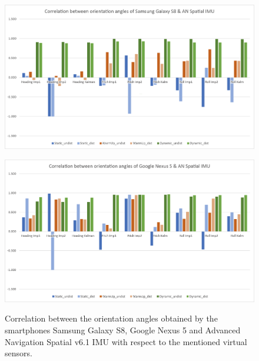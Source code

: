 \documentclass[review]{elsarticle}
\begin{document}
\begin{figure}[htbp!]
\begin{center}
	 	\begin{minipage}{\columnwidth}
	 		\centering
			\subfigure
			{\includegraphics[keepaspectratio, width=1\columnwidth]{graphics/sensor_correlation_s8_imu}\label{fig:sensor_sensi:imu_correlation_s8_nex5:s8}}
	 	\end{minipage} 
	 	\begin{minipage}{\columnwidth}
	 		\centering
			\subfigure 
			{\includegraphics[keepaspectratio, width=1\columnwidth]{graphics/sensor_correlation_nex5_imu}\label{fig:sensor_sensi:imu_correlation_s8_nex5:nex5}}
	 	\end{minipage}
		
		\caption{Correlation between the orientation angles obtained by the smartphones Samsung Galaxy S8, Google Nexus 5 and Advanced Navigation Spatial v6.1 \gls{IMU} with respect to the mentioned virtual sensors. }
	\label{fig:sensor_sensi:imu_correlation_s8_nex5}
\end{center}
\end{figure}
\end{document}
